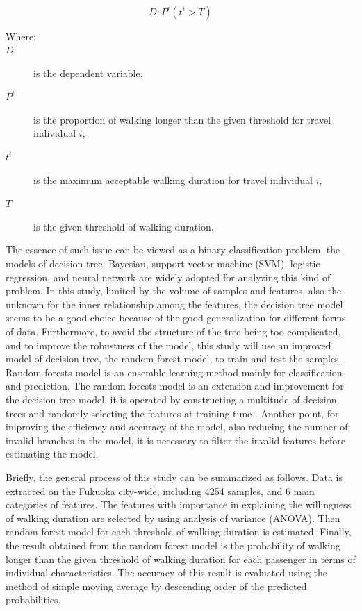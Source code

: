 \documentclass[Journal,letterpaper]{ascelike-new}
\begin{document}
%
\begin{equation}
    D: P^i(t^i>T)
    \label{eq:1}
\end{equation}

%
\begin{description}
    \item[Where:]
    \item[$D$] is the dependent variable,
    \item[$P^i$] is the proportion of walking longer than the given threshold for travel individual $i$,
    \item[$t^i$] is the maximum acceptable walking duration for travel individual $i$,
    \item[$T$] is the given threshold of walking duration.
\end{description}

%
The essence of such issue can be viewed as a binary classification problem, the models of decision tree, Bayesian, support vector machine (SVM), logistic regression, and neural network are widely adopted for analyzing this kind of problem. In this study, limited by the volume of samples and features, also the unknown for the inner relationship among the features, the decision tree model seems to be a good choice because of the good generalization for different forms of data. Furthermore, to avoid the structure of the tree being too complicated, and to improve the robustness of the model, this study will use an improved model of decision tree, the random forest model, to train and test the samples. Random forests model is an ensemble learning method mainly for classification and prediction. The random forests model is an extension and improvement for the decision tree model, it is operated by constructing a multitude of decision trees and randomly selecting the features at training time \cite{Ho1995,Ho1998}. Another point, for improving the efficiency and accuracy of the model, also reducing the number of invalid branches in the model, it is necessary to filter the invalid features before estimating the model.

%
Briefly, the general process of this study can be summarized as follows. Data is extracted on the Fukuoka city-wide, including 4254 samples, and 6 main categories of features. The features with importance in explaining the willingness of walking duration are selected by using analysis of variance (ANOVA). Then random forest model for each threshold of walking duration is estimated. Finally, the result obtained from the random forest model is the probability of walking longer than the given threshold of walking duration for each passenger in terms of individual characteristics. The accuracy of this result is evaluated using the method of simple moving average by descending order of the predicted probabilities.
\end{document}
